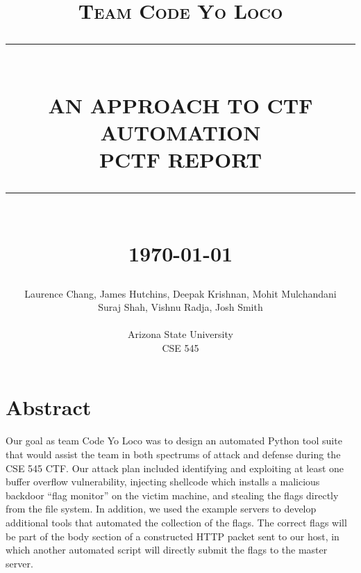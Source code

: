 \documentclass[12pt]{report}
\newcommand{\HRule}[1]{\rule{\linewidth}{#1}}
\begin{document}
\title{ \normalsize \textsc{Team Code Yo Loco}
		\\ [2.0cm]
		\HRule{0.5pt} \\
		\LARGE \textbf{\uppercase{An Approach to CTF Automation \\ PCTF Report}}
		\HRule{2pt} \\ [0.5cm]
		\normalsize \today \vspace*{5\baselineskip}}

\date{}

\author{Laurence Chang, James Hutchins, Deepak Krishnan, Mohit Mulchandani
		\\ Suraj Shah, Vishnu Radja, Josh Smith \\ \\ 
		Arizona State University \\
		CSE 545 }

\maketitle
\tableofcontents
\newpage

\sectionfont{\scshape}

\section*{Abstract}
Our goal as team Code Yo Loco was to design an automated Python tool suite that would assist the team in both spectrums of attack and defense during the CSE 545 CTF. Our attack plan included identifying and exploiting at least one buffer overflow vulnerability, injecting shellcode which installs a malicious backdoor “flag monitor” on the victim machine, and stealing the flags directly from the file system. In addition, we used the example servers to develop additional tools that automated the collection of the flags. The correct flags will be part of the body section of a constructed HTTP packet sent to our host, in which another automated script will directly submit the flags to the master server. 

\end{document}
